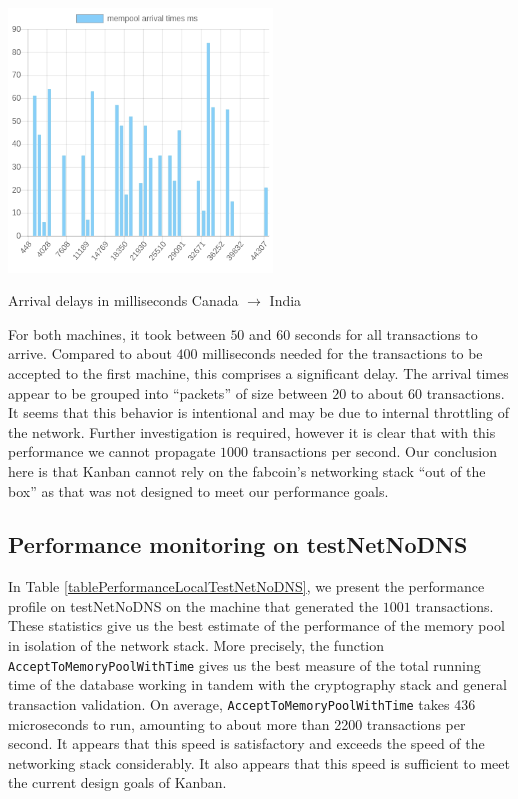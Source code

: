\documentclass{article}
\begin{document}
\begin{table}
	\begin{center}
		\includegraphics[width = 7cm]{./images/mempoolArrivalsMumbai.png}
	\end{center}
	\caption{\label{tableArrivalTimesToMumbai} Arrival delays in milliseconds Canada $ \to$ India}
\end{table}

For both machines, it took between $50$ and $60$ seconds for all transactions to arrive. Compared to about $400$ milliseconds needed for the transactions to be accepted to the first machine, this comprises a significant delay. The arrival times appear to be grouped into ``packets'' of size between $20$ to about $60$ transactions. It seems that this behavior is intentional and may be due to internal throttling of the network. Further investigation is required, however it is clear that with this performance we cannot propagate $1000$ transactions per second. Our conclusion here is that Kanban cannot rely on the fabcoin's networking stack ``out of the box'' as that was not designed to meet our performance goals. 


\subsection{Performance monitoring on testNetNoDNS}\label{secPerformanceMonitoringTestNetNoDNS}
In Table \ref{tablePerformanceLocalTestNetNoDNS}, we present the performance profile on testNetNoDNS on the machine that generated the $1001$ transactions. These statistics give us the best estimate of the performance of the memory pool in isolation of the network stack. More precisely, the function \verb|AcceptToMemoryPoolWithTime| gives us the best measure of the total running time of the database working in tandem with the cryptography stack and general transaction validation. On average, \verb|AcceptToMemoryPoolWithTime| takes $436$ microseconds to run, amounting to about more than 2200 transactions per second. It appears that this speed is satisfactory and exceeds the speed of the networking stack considerably. It also appears that this speed is sufficient to meet the current design goals of Kanban.  
\end{document}
